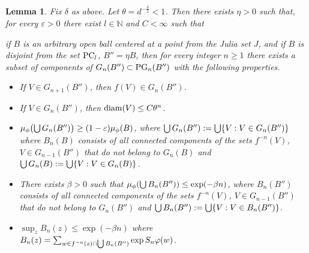 \documentclass[12pt]{amsart}
\numberwithin{equation}{section}
\newcommand{\blem}{\begin{lem}}
\newcommand{\elem}{\end{lem}}
\newcommand{\nl}{\newline}
\newtheorem{lem}[thm]{Lemma}
\def\g{\gamma}                \def\Ga{\Gamma}           \def\l{\lambda}
\def\({\bigl(}                \def\){\bigr)}
\def\sbt{\subset}             \def\spt{\supset}
\def\sp{\medskip}             \def\fr{\noindent}        \def\nl{\newline}
\begin{document}
\blem\label{l1fiw20110702}
Fix $\delta$ as above. Let $\theta=d^{-\frac{\delta}{2}}<1$. Then there exists $\eta>0$ such that, for every $\varepsilon>0$ there exist $l\in\mathbb{N}$ and $C<\infty$ such that 


if $B$ is an arbitrary open ball centered at a point from the Julia set $J$, and if
$B$ is disjoint from the set $\text{{\rm PC}}_l$, $B''=\eta B$,  then for every integer $n\ge 1$
there exists a subset  of components of   $G_n( B'')\sbt \PG_{n}(B'')$ with the following properties. 

\begin{itemize}

\sp\item[(a)] If $V\in G_{n+1}(B'')$, then $f(V)\in G_n(B'')$.

\sp\item[(b)] If $V\in G_{n}(B'')$, then $\text{\rm {diam}}(V)\le C \theta^n$.

\sp\item[(c)] $\mu_\phi\(\bu G_n(B'')\)\ge (1-\e)\mu_\phi(B)$, where
              $\bigcup G_n(B''):=\bigcup\{V:V\in G_n(B'')\}$  
              where
              $B_n(B)$ consists of all connected components of the sets
              $f^{-n}(V)$, $V\in G_{n-1}(B'')$ that do not belong to 
              $G_n(B)$ and  $\bigcup G_n(B):=\bigcup\{V:V\in G_n(B)\}$. 
\sp\item[(d)] There exists $\beta>0$ such that $\mu_\phi(\bigcup B_n(B'')) \le\exp(-\beta n)$, where  $B_n(B'')$              
              consists of all connected components of the sets
              $f^{-n}(V)$, $V\in G_{n-1}(B'')$ that do not belong to 
              $G_n(B'')$ and  $\bigcup B_n(B''):=\bigcup\{V:V\in B_n(B'')\}$. 
              
\sp\item[(e)] $\sup_z B_n(z)\le\exp(-\beta n)$ where $B_n(z)=\sum_{w\in f^{-n}(z)\cap \bigcup B_n(B'')}\exp S_n\varphi(w)$.   

           
\end{itemize}
\elem
\end{document}
